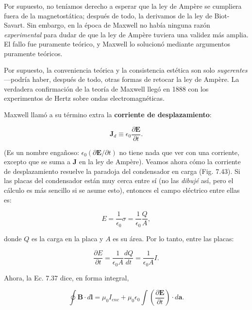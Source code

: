 \documentclass[12pt,a4paper]{report}
\newcommand{\esp}{\vspace{0.5cm}}
\begin{document}
	\esp
	Por supuesto, no teníamos derecho a esperar que la ley de Ampère se cumpliera fuera de la magnetostática; después de todo, la derivamos de la ley de Biot-Savart. Sin embargo, en la época de Maxwell no había ninguna razón \textit{experimental} para dudar de que la ley de Ampère tuviera una validez más amplia. El fallo fue puramente teórico, y Maxwell lo solucionó mediante argumentos puramente teóricos.
	
	\vspace{0.5cm}
	
	\noindent Por supuesto, la conveniencia teórica y la consistencia estética son solo \textit{sugerentes} ---podría haber, después de todo, otras formas de retocar la ley de Ampère. La verdadera confirmación de la teoría de Maxwell llegó en 1888 con los experimentos de Hertz sobre ondas electromagnéticas.
	
	Maxwell llamó a su término extra la \textbf{corriente de desplazamiento}:
	
	\begin{equation}
		\mathbf{J}_d \equiv \epsilon_0 \frac{\partial \mathbf{E}}{\partial t}. \tag{7.38}
	\end{equation}
	
	\noindent (Es un nombre engañoso: $\epsilon_0 (\partial \mathbf{E} / \partial t)$ no tiene nada que ver con una corriente, excepto que se suma a $\mathbf{J}$ en la ley de Ampère). Veamos ahora cómo la corriente de desplazamiento resuelve la paradoja del condensador en carga (Fig. 7.43). Si las placas del condensador están muy cerca entre sí (no las \textit{dibujé} así, pero el cálculo es más sencillo si se asume esto), entonces el campo eléctrico entre ellas es:
	
	\begin{equation*}
		E = \frac{1}{\epsilon_0} \sigma = \frac{1}{\epsilon_0} \frac{Q}{A},
	\end{equation*}
	
	\noindent donde $Q$ es la carga en la placa y $A$ es su área. Por lo tanto, entre las placas:
	
	\begin{equation*}
		\frac{\partial E}{\partial t} = \frac{1}{\epsilon_0 A} \frac{dQ}{dt} = \frac{1}{\epsilon_0 A} I.
	\end{equation*}
	
	\noindent Ahora, la Ec. 7.37 dice, en forma integral,
	
	\begin{equation}
		\oint \mathbf{B} \cdot d\mathbf{l} = \mu_0 I_{enc} + \mu_0 \epsilon_0 \int \left( \frac{\partial \mathbf{E}}{\partial t} \right) \cdot d\mathbf{a}. \tag{7.39}
	\end{equation}
	
\end{document}
